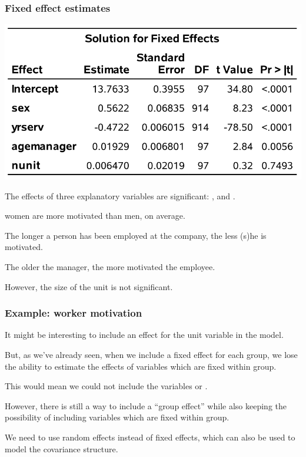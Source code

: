 \documentclass{beamer}
\begin{document}
 \begin{frame}
\frametitle{Fixed effect estimates}
\begin{center}
\includegraphics[width = 0.7\linewidth]{img/c6/slides7-e10}
\end{center}
\bi
\item The effects of three explanatory variables are significant: ,  and .
\bi

\item women are more motivated than men, on average. 
\item The longer a person has been employed at the company, the less (s)he is motivated. 
\item The older the manager, the more motivated the employee. 
\ei
\item However, the size of the unit is not significant.
\ei
\end{frame}


\begin{frame}[fragile]
\frametitle{Example: worker motivation}
\bi
\item It might be interesting to include an effect for the unit variable in the model. 
\item But, as we've already seen, when we include a fixed effect for each group, we lose the ability to estimate the effects of variables which are fixed within group. 
\item This would mean we could not include the variables  or .
\item However, there is still a way to include a ``group effect'' while also keeping the possibility of including variables which are fixed within group. 
\item We need to use \alert{random effects} instead of fixed effects, which can also be used to model the covariance structure.
\ei
\end{frame}
\end{document}

